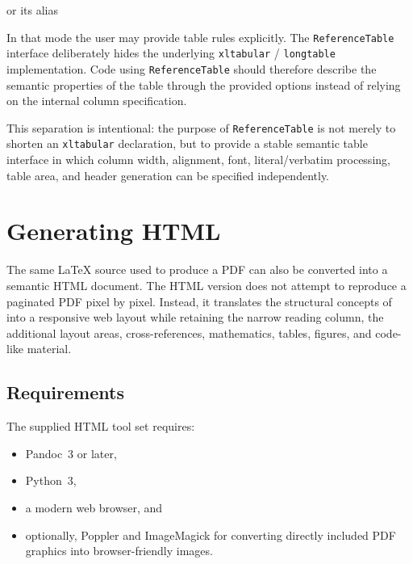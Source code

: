 \documentclass[
11pt,
a4paper,
oneside
]{scrbook}
\begin{document}


or its alias




In that mode the user may provide table rules explicitly.
The \texttt{ReferenceTable} interface deliberately hides the underlying
\texttt{xltabular} / \texttt{longtable} implementation. Code using
\texttt{ReferenceTable} should therefore describe the semantic properties of
the table through the provided options instead of relying on the internal
column specification.

This separation is intentional: the purpose of \texttt{ReferenceTable} is
not merely to shorten an \texttt{xltabular} declaration, but to provide a
stable semantic table interface in which column width, alignment, font,
literal/verbatim processing, table area, and header generation can be
specified independently.

\chapter{Generating HTML}
\label{chap:HTMLGeneration}

The same \LaTeX{} source used to produce a PDF can also be converted into a
semantic HTML document. The HTML version does not attempt to reproduce a
paginated PDF pixel by pixel. Instead, it translates the structural concepts
of \MDWordmark into a responsive web layout while retaining the narrow reading
column, the additional layout areas, cross-references, mathematics, tables,
figures, and code-like material.

\section{Requirements}

The supplied HTML tool set requires:

\begin{itemize}
	\item Pandoc~3 or later,
	\item Python~3,
	\item a modern web browser, and
	\item optionally, Poppler and ImageMagick for converting directly included
	PDF graphics into browser-friendly images.
\end{itemize}
\end{document}
